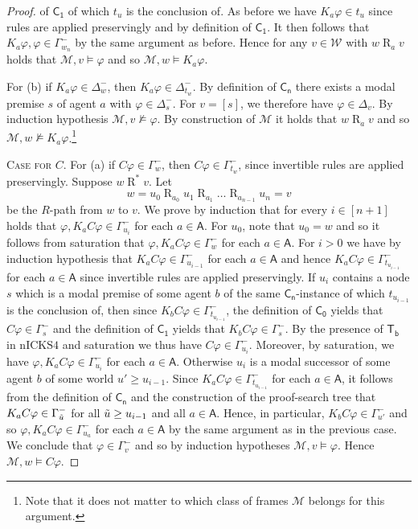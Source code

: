 \documentclass{myifcolog}
\newcommand\C {C}
\newcommand{\K}{K}
\newcommand\A{\mathsf{A}}
\newcommand{\agi}{a}
\newcommand{\agii}{b}
\newcommand{\fw}{\mathcal{M}}
\newcommand{\Rel}{\mathrel{R}}
\newcommand{\W}{\mathcal{W}}
\newcommand{\nicks}{\mathrm{nICKS4}}
\numberwithin{theorem}{section}
\begin{document}
\begin{proof}
of $\mathsf{C_1}$ of which $t_{u}$ is the conclusion of. As before we have $\K_\agi \varphi \in t_u$ since rules are applied preservingly and by definition of $\mathsf{C_1}$. It then follows that $\K_\agi \varphi, \varphi \in \Gamma_{w_n}^-$ by the same argument as before. Hence for any $v \in \W$ with $w \Rel_\agi v$ holds that $\fw,v \models \varphi$ and so $\fw, w \models \K_\agi \varphi$. 

For (b) if $\K_\agi\varphi\in \Delta_w^-$, then $\K_\agi \varphi \in \Delta_{t_w}^-$. By definition of $\mathsf{C_n}$ there exists a modal premise $s$ of agent $\agi$ with $\varphi \in \Delta_s^-$. For $v = [s]$, we therefore have $\varphi \in \Delta_v$. By induction hypothesis $\fw,v\not\models \varphi$. By construction of $\fw$ it holds that $w \Rel_\agi v$ and  so $\fw,w\not\models \K_\agi\varphi$.\footnote{Note that it does not matter to which class of frames $\fw$ belongs for this argument.} \smallskip
    
\noindent \textsc{Case for $\C$.} For (a) if $\C\varphi\in \Gamma^-_w$, then $\C \varphi \in \Gamma_{t_w}^-$, since invertible rules are applied preservingly. Suppose $w\Rel^* v$. Let 
\begin{equation*}
    w = u_0 \Rel_{\agi_0} u_1 \Rel_{\agi_1} \ldots \Rel_{\agi_{n-1}} u_n = v
\end{equation*}
be the $R$-path from $w$ to $v$. We prove by induction that for every $i \in [n+1]$ holds that ${\varphi, \K_\agi \C \varphi \in \Gamma_{u_i}^-}$ for each $\agi \in \A$. For $u_0$, note that $u_0= w$ and so it follows from saturation that  $\varphi, \K_\agi \C \varphi \in \Gamma_w^-$ for each $\agi \in \A$. For $i >0$ we have by induction hypothesis that $\K_\agi \C \varphi \in \Gamma_{u_{i-1}}^-$ for each $\agi \in \A$ and hence $\K_\agi \C \varphi \in \Gamma_{t_{u_{i-1}}}^-$ for each $\agi \in \A$ since invertible rules are applied preservingly. If $u_i$ contains a node $s$ which is a modal premise of some agent $\agii$ of the same $\mathsf{C_n}$-instance of which $t_{u_{i-1}}$ is the conclusion of, then since $\K_\agii \C \varphi \in \Gamma_{t_{u_{i-1}}}^-$, the definition of $\mathsf{C_0}$ yields that $\C \varphi \in \Gamma_s^-$ and the definition of $\mathsf{C_1}$ yields that $\K_\agii \C \varphi \in \Gamma_s^-$. By the presence of $\mathsf{T_\agii}$ in $\nicks$ and saturation we thus have $\C \varphi \in \Gamma_{u_i}^-$. Moreover, by saturation, we have $\varphi, \K_\agi \C \varphi \in \Gamma_{u_i}^-$ for each $\agi \in \A$. Otherwise $u_i$ is a modal successor of some agent $\agii$ of some world $u' \geq u_{i-1}$. Since $\K_\agi \C \varphi \in \Gamma_{t_{u_{i-1}}}^-$ for each $\agi \in \A$, it follows from the definition of $\mathsf{C_n}$ and the construction of the proof-search tree that $\K_\agi \C \varphi \in \Gamma_{\Tilde{u}}^-$ for all $\Tilde{u} \geq u_{i-1}$ and all $\agi \in \A$. Hence, in particular, $\K_\agii \C \varphi \in \Gamma_{u'}^-$ and so $\varphi, \K_\agi \C \varphi \in \Gamma_{u_\agi}^-$ for each $\agi \in \A$ by the same argument as in the previous case. We conclude that $\varphi \in \Gamma_v^-$ and so by induction hypotheses $\fw, v \models \varphi$. Hence $\fw, w \models \C \varphi$.


\end{proof}
\end{document}
